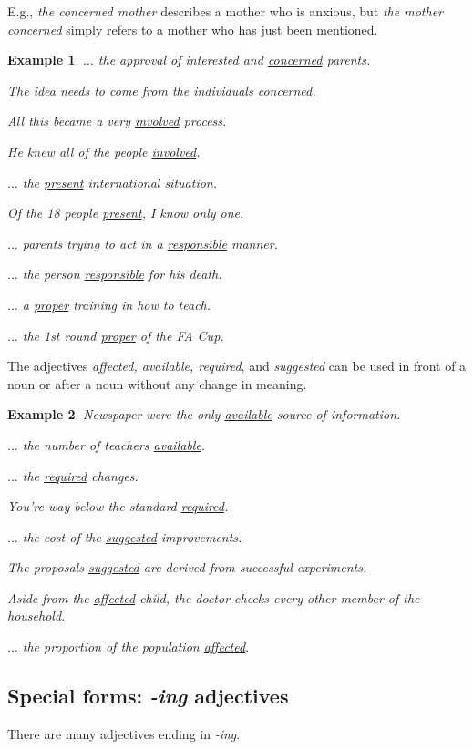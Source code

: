\documentclass[oneside]{book}
\numberwithin{equation}{section}
\newtheorem{example}{Example}[section]
\begin{document}
E.g., \textit{the concerned mother} describes a mother who is anxious, but \textit{the mother concerned} simply refers to a mother who has just been mentioned.
\begin{example}
    $\ldots$ the approval of interested and \underline{concerned} parents.
    
    The idea needs to come from the individuals \underline{concerned}.
    
    All this became a very \underline{involved} process.
    
    He knew all of the people \underline{involved}.
    
    $\ldots$ the \underline{present} international situation.
    
    Of the 18 people \underline{present}, I know only one.
    
    $\ldots$ parents trying to act in a \underline{responsible} manner.
    
    $\ldots$ the person \underline{responsible} for his death.
    
    $\ldots$ a \underline{proper} training in how to teach.
    
    $\ldots$ the 1st round \underline{proper} of the FA Cup.
\end{example}
%
\noindent{} The adjectives \textit{affected, available, required}, and \textit{suggested} can be used in front of a noun or after a noun without any change in meaning.
\begin{example}
    Newspaper were the only \underline{available} source of information.
    
    $\ldots$ the number of teachers \underline{available}.
    
    $\ldots$ the \underline{required} changes.
    
    You're way below the standard \underline{required}.
    
    $\ldots$ the cost of the \underline{suggested} improvements.
    
    The proposals \underline{suggested} are derived from successful experiments.
    
    Aside from the \underline{affected} child, the doctor checks every other member of the household.
    
    $\ldots$ the proportion of the population \underline{affected}.
\end{example}

\subsection{Special forms: \textit{-ing} adjectives}
\noindent{} There are many adjectives ending in \textit{-ing}.
\end{document}
